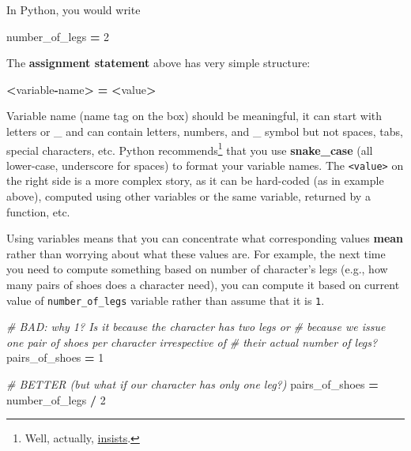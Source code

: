 \documentclass[
]{book}
\newenvironment{Shaded}{\begin{snugshade}}{\end{snugshade}}
\newcommand{\CommentTok}[1]{\textcolor[rgb]{0.56,0.35,0.01}{\textit{#1}}}
\newcommand{\DecValTok}[1]{\textcolor[rgb]{0.00,0.00,0.81}{#1}}
\newcommand{\NormalTok}[1]{#1}
\newcommand{\OperatorTok}[1]{\textcolor[rgb]{0.81,0.36,0.00}{\textbf{#1}}}
\begin{document}
In Python, you would write

\begin{Shaded}
\begin{Highlighting}[]
\NormalTok{number\_of\_legs }\OperatorTok{=} \DecValTok{2}
\end{Highlighting}
\end{Shaded}

The \textbf{assignment statement} above has very simple structure:

\begin{Shaded}
\begin{Highlighting}[]
\OperatorTok{\textless{}}\NormalTok{variable}\OperatorTok{{-}}\NormalTok{name}\OperatorTok{\textgreater{}} \OperatorTok{=} \OperatorTok{\textless{}}\NormalTok{value}\OperatorTok{\textgreater{}}
\end{Highlighting}
\end{Shaded}

Variable name (name tag on the box) should be meaningful, it can start with letters or \_ and can contain letters, numbers, and \_ symbol but not spaces, tabs, special characters, etc. Python recommends\footnote{Well, actually, \href{https://www.python.org/dev/peps/pep-0008/}{insists}.} that you use \textbf{snake\_case} (all lower-case, underscore for spaces) to format your variable names. The \texttt{\textless{}value\textgreater{}} on the right side is a more complex story, as it can be hard-coded (as in example above), computed using other variables or the same variable, returned by a function, etc.

Using variables means that you can concentrate what corresponding values \textbf{mean} rather than worrying about what these values are. For example, the next time you need to compute something based on number of character's legs (e.g., how many pairs of shoes does a character need), you can compute it based on current value of \texttt{number\_of\_legs} variable rather than assume that it is \texttt{1}.

\begin{Shaded}
\begin{Highlighting}[]
\CommentTok{\# BAD: why 1? Is it because the character has two legs or}
\CommentTok{\# because we issue one pair of shoes per character irrespective of}
\CommentTok{\# their actual number of legs?}
\NormalTok{pairs\_of\_shoes }\OperatorTok{=} \DecValTok{1}

\CommentTok{\# BETTER (but what if our character has only one leg?)}
\NormalTok{pairs\_of\_shoes }\OperatorTok{=}\NormalTok{ number\_of\_legs }\OperatorTok{/} \DecValTok{2}
\end{Highlighting}
\end{Shaded}
\end{document}
